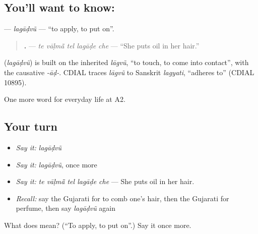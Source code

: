 \subsection*{You'll want to know: }
\textbf{} — \emph{lagāḍvũ} — \textquotedblleft{}to apply, to put on\textquotedblright{}.

\begin{quote}
\textbf{    .} — \emph{te vāḷmā̃ tel lagāḍe che} — \textquotedblleft{}She puts oil in her hair.\textquotedblright{}
\end{quote}

\begin{cousinweb}
\textbf{} (\emph{lagāḍvũ}) is built on the inherited \emph{lāgvũ}, \textquotedblleft{}to touch, to come into contact\textquotedblright{}, with the causative \emph{-āḍ-}. CDIAL traces \emph{lāgvũ} to Sanskrit \emph{lagyati}, \textquotedblleft{}adheres to\textquotedblright{} (CDIAL 10895).
\end{cousinweb}

\begin{grammarlens}[title={What you've built}]
One more word for everyday life at A2.
\end{grammarlens}

\subsection*{Your turn}
\begin{itemize}
\raggedright
  \item \emph{Say it:} \emph{lagāḍvũ}
  \item \emph{Say it:} \emph{lagāḍvũ}, once more
  \item \emph{Say it:} \emph{te vāḷmā̃ tel lagāḍe che} — She puts oil in her hair.
  \item \emph{Recall:} say the Gujarati for to comb one's hair, then the Gujarati for perfume, then say \emph{lagāḍvũ} again
\end{itemize}

\begin{tcolorbox}[breakable,colback=teal!4,colframe=teal!35!black,title={Before you move on}]
What does  mean? (\textquotedblleft{}To apply, to put on\textquotedblright{}.) Say it once more.
\end{tcolorbox}
